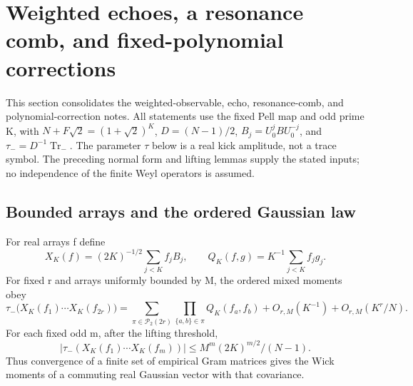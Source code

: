 \section{Weighted echoes, a resonance comb, and fixed-polynomial corrections}
\label{sec:weighted}
This section consolidates the weighted-observable, echo, resonance-comb,
and polynomial-correction notes. All statements use the fixed Pell map and
odd prime K, with $N+F\sqrt2=(1+\sqrt2)^K$, $D=(N-1)/2$,
$B_j=U_0^jBU_0^{-j}$, and $\tau_-=D^{-1}\operatorname{Tr}_-$.
The parameter $\tau$ below is a real kick amplitude, not a trace symbol.
The preceding normal form and lifting lemmas supply the stated inputs;
no independence of the finite Weyl operators is assumed.

\subsection{Bounded arrays and the ordered Gaussian law}
For real arrays f define
\[
 X_K(f)=(2K)^{-1/2}\sum_{j<K} f_j B_j,\qquad
 Q_K(f,g)=K^{-1}\sum_{j<K}f_jg_j.
\]
For fixed r and arrays uniformly bounded by M, the ordered mixed moments obey
\begin{equation}\label{eq:weighted-moments}
 \tau_-\bigl(X_K(f_1)\cdots X_K(f_{2r})\bigr)
 =\sum_{\pi\in\mathcal P_2(2r)}\prod_{\{a,b\}\in\pi}Q_K(f_a,f_b)
       +O_{r,M}(K^{-1})+O_{r,M}(K^r/N).
\end{equation}
For each fixed odd m, after the lifting threshold,
\[
 |\tau_-(X_K(f_1)\cdots X_K(f_m))|
       \leq M^m(2K)^{m/2}/(N-1).
\]
Thus convergence of a finite set of empirical Gram matrices gives the Wick
moments of a commuting real Gaussian vector with that covariance.

